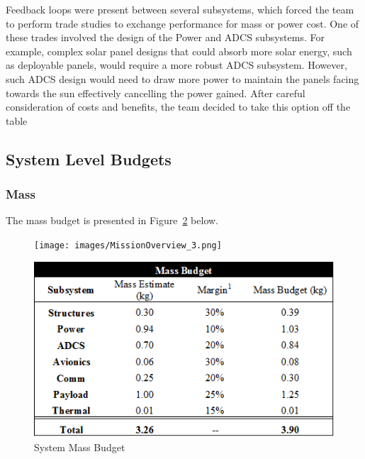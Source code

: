 \documentclass[12pt]{article}
\begin{document}
Feedback loops were present between several subsystems, which forced the team to perform trade studies to exchange performance for mass or power cost. One of these trades involved the design of the Power and ADCS subsystems. For example, complex solar panel designs that could absorb more solar energy, such as deployable panels, would require a more robust ADCS subsystem. However, such ADCS design would need to draw more power to maintain the panels facing towards the sun effectively cancelling the power gained. After careful consideration of costs and benefits, the team decided to take this option off the table
	
	\subsection{System Level Budgets}
		\subsubsection{Mass}
		The mass budget is presented in Figure~\ref{fig:Mission_mass2} below. 
			\begin{figure}[!ht]
				\centering
				\texttt{[image: images/MissionOverview\_3.png]}
				\label{fig:Mission_mass1}
			\end{figure}
		
			\begin{figure}[!ht]
				\centering
				\includegraphics[width=5in]{images/MissionOverview_5.png}
				\caption{System Mass Budget}
				\label{fig:Mission_mass2}
			\end{figure}
			
\end{document}
